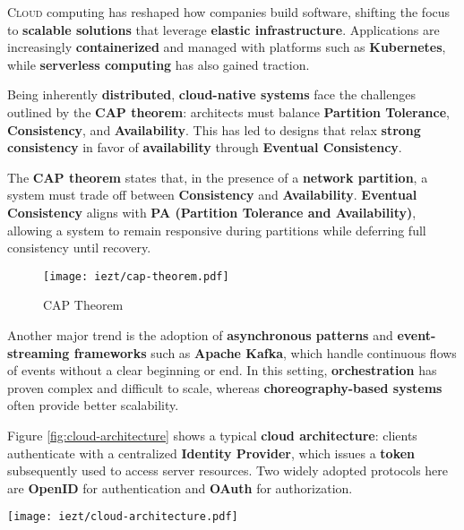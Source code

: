 \lettrine{C}{loud} computing has reshaped how companies build software, shifting the focus to \textbf{scalable solutions} that leverage \textbf{elastic infrastructure}. 
Applications are increasingly \textbf{containerized} and managed with platforms such as \textbf{Kubernetes}, while \textbf{serverless computing} has also gained traction.  

\vspace{0.5em} Being inherently \textbf{distributed}, \textbf{cloud-native systems} face the challenges outlined by the \textbf{CAP theorem}: architects must balance \textbf{Partition Tolerance}, \textbf{Consistency}, and \textbf{Availability}. 
This has led to designs that relax \textbf{strong consistency} in favor of \textbf{availability} through \textbf{Eventual Consistency}.  

\begin{boxF}
    The \textbf{CAP theorem} \cite{c1} states that, in the presence of a \textbf{network partition}, a system must trade off between \textbf{Consistency} and \textbf{Availability}. 
    \textbf{Eventual Consistency} aligns with \textbf{PA (Partition Tolerance and Availability)}, allowing a system to remain responsive during partitions while deferring full consistency until recovery. 
\end{boxF}

\begin{figure}[h]
    \centering
    \texttt{[image: iezt/cap-theorem.pdf]}
    \caption{CAP Theorem}
    \label{fig:cap-theorem}
\end{figure}

Another major trend is the adoption of \textbf{asynchronous patterns} and \textbf{event-streaming frameworks} such as \textbf{Apache Kafka}, which handle continuous flows of events without a clear beginning or end.  
In this setting, \textbf{orchestration} has proven complex and difficult to scale, whereas \textbf{choreography-based systems} often provide better scalability.  

Figure \ref{fig:cloud-architecture} shows a typical \textbf{cloud architecture}: clients authenticate with a centralized \textbf{Identity Provider}, which issues a \textbf{token} subsequently used to access server resources. 
Two widely adopted protocols here are \textbf{OpenID} \cite{c4} for authentication and \textbf{OAuth} \cite{c5} for authorization.  

\begin{figure*}[htbp]
    \centering
    \texttt{[image: iezt/cloud-architecture.pdf]}
    \caption{Cloud Architecture}
    \label{fig:cloud-architecture}
\end{figure*}

